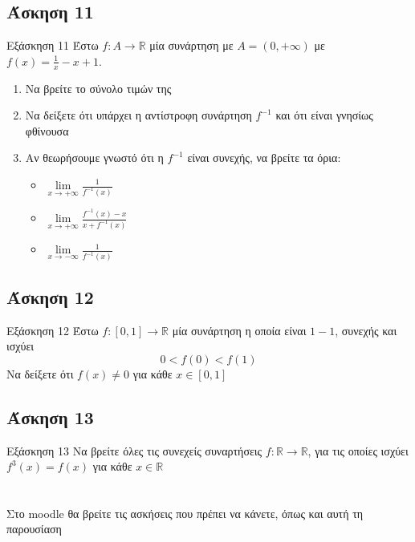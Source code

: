 \documentclass[greek]{beamer}
\begin{document}
\subsection{Άσκηση 11}
\begin{frame}{Εξάσκηση 11}
      Έστω $f:Α\to\mathbb{R}$ μία συνάρτηση με $Α=(0,+\infty)$ με $f(x)=\frac{1}{x}-x+1$.
      \begin{enumerate}
            \item<1-> Να βρείτε το σύνολο τιμών της
            \item<2-> Να δείξετε ότι υπάρχει η αντίστροφη συνάρτηση $f^{-1}$ και ότι είναι γνησίως φθίνουσα
            \item<3-> Αν θεωρήσουμε γνωστό ότι η $f^{-1}$ είναι συνεχής, να βρείτε τα όρια:
                  \begin{itemize}
                        \item $\lim\limits_{x \to +\infty}{ \frac{1}{f^{-1}(x)} }$
                        \item<4-> $\lim\limits_{x \to +\infty}{ \frac{f^{-1}(x)-x}{x+f^{-1}(x)} }$
                        \item<5-> $\lim\limits_{x \to -\infty}{ \frac{1}{f^{-1}(x)} }$
                  \end{itemize}
      \end{enumerate}
\end{frame}

\subsection{Άσκηση 12}
\begin{frame}{Εξάσκηση 12}
      Έστω $f:[0,1]\to\mathbb{R}$ μία συνάρτηση η οποία είναι $1-1$, συνεχής και ισχύει
      $$0<f(0)<f(1)$$
      Να δείξετε ότι $f(x)\ne 0$ για κάθε $x\in [0,1]$
\end{frame}

\subsection{Άσκηση 13}
\begin{frame}{Εξάσκηση 13}
      Να βρείτε όλες τις συνεχείς συναρτήσεις $f:\mathbb{R}\to\mathbb{R}$, για τις οποίες ισχύει $f^3(x)=f(x)$ για κάθε $x\in\mathbb{R}$
\end{frame}

\section{}
\begin{frame}
      Στο moodle θα βρείτε τις ασκήσεις που πρέπει να κάνετε, όπως και αυτή τη παρουσίαση
\end{frame}
\end{document}
